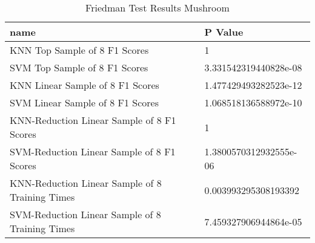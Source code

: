 \begin{table}
\centering
\caption{Friedman Test Results Mushroom}
\label{tab:friedman_test_results_mushroom}
\begin{tabular}{ll}
\toprule
name & P Value \\
\midrule
KNN Top Sample of 8 F1 Scores & 1 \\
SVM Top Sample of 8 F1 Scores & 3.331542319440828e-08 \\
KNN Linear Sample of 8 F1 Scores & 1.477429493282523e-12 \\
SVM Linear Sample of 8 F1 Scores & 1.068518136588972e-10 \\
KNN-Reduction Linear Sample of 8 F1 Scores & 1 \\
SVM-Reduction Linear Sample of 8 F1 Scores & 1.3800570312932555e-06 \\
KNN-Reduction Linear Sample of 8 Training Times & 0.003993295308193392 \\
SVM-Reduction Linear Sample of 8 Training Times & 7.459327906944864e-05 \\
\bottomrule
\end{tabular}
\end{table}
